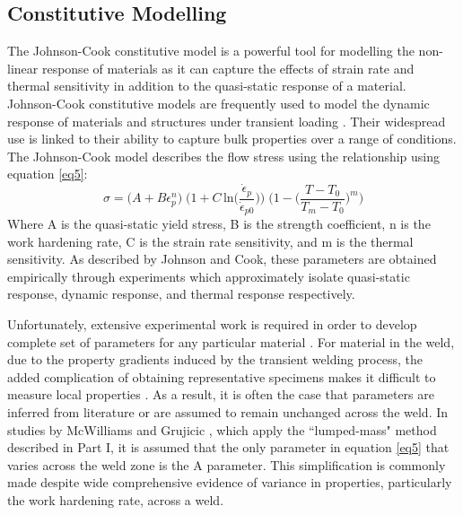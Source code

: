 	\subsection{Constitutive Modelling}
	\label{ModellingMaterials}
	The Johnson-Cook constitutive model is a powerful tool for modelling the non-linear response of materials as it can capture the effects of strain rate and thermal sensitivity in addition to the quasi-static response of a material. Johnson-Cook constitutive models are frequently used to model the dynamic response of materials and structures under transient loading \cite{Grujicic2009,Grujicic2011a,Dey2007}. Their widespread use is linked to their ability to capture bulk properties over a range of conditions. The Johnson-Cook model describes the flow stress using the relationship using equation \ref{eq5}:
	\begin{equation}
	\label{eq5}
	\sigma = \bigg( A + B\epsilon^n_{p} \bigg)\; \bigg(1 +C\,\text{ln}\bigg(\frac{\dot{\epsilon}_{p}}{\dot{\epsilon}_{p0}}\bigg)\bigg)\; \bigg(1-\bigg(\frac{T-T_0}{T_m-T_0}\bigg)^m\bigg)
	\end{equation}	
	Where A is the quasi-static yield stress, B is the strength coefficient, n is the work hardening rate, C is the strain rate sensitivity, and m is the thermal sensitivity. As described by Johnson and Cook, these parameters are obtained empirically through experiments which approximately isolate quasi-static response, dynamic response, and thermal response respectively. 
	
	Unfortunately, extensive experimental work is required in order to develop complete set of parameters for any particular material \cite{Johnson1983c}. 
	For material in the weld, due to the property gradients induced by the transient welding process, the added complication of obtaining representative specimens makes it difficult to measure local properties \cite{Genevois2006}.
	As a result, it is often the case that parameters are inferred from literature or are assumed to remain unchanged across the weld. In studies by McWilliams \cite{McWilliams2013} and Grujicic \cite{Grujicic2011a}, which apply the ``lumped-mass" method described in Part I, it is assumed that the only parameter in equation \ref{eq5} that varies across the weld zone is the A parameter. This simplification is commonly made despite wide comprehensive evidence of variance in properties, particularly the work hardening rate, across a weld. 
	
